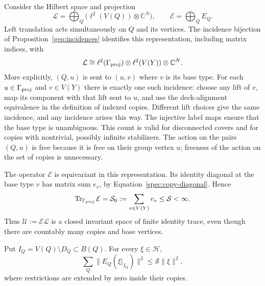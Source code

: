 Consider the Hilbert space and projection
\begin{equation}
 \mathcal L=\bigoplus_Q\big(\ell^2(V(Q))\otimes\mathbb C^N\big),
       \qquad\mathcal E=\bigoplus_Q E_Q.
 \label{spec:all-copies}
\end{equation}
Left translation acts simultaneously on $Q$ and its vertices. The
incidence bijection of Proposition~\ref{geo:incidences} identifies this
representation, including matrix indices, with
\begin{equation}
 \mathcal L\cong\ell^2(\Gamma_{\mathrm{proj}})\otimes\ell^2(V(Y))\otimes\mathbb C^N.
 \label{spec:incidence-identification}
\end{equation}
More explicitly, $(Q,u)$ is sent to $(u,v)$ where $v$ is its base type.
For each $u\in\Gamma_{\mathrm{proj}}$ and $v\in V(Y)$ there is exactly one such incidence:
choose any lift of $v$, map its component with that lift sent to $u$,
and use the deck-alignment equivalence in the definition of indexed
copies. Different lift choices give the same incidence, and any
incidence arises this way. The injective label maps ensure that the
base type is unambiguous. This count is valid for disconnected covers
and for copies with nontrivial, possibly infinite stabilizers. The
action on the pairs $(Q,u)$ is free because it is free on their group
vertex $u$; freeness of the action on the set of copies is unnecessary.

The operator $\mathcal E$ is equivariant in this representation. Its
identity diagonal at the base type $v$ has matrix sum $e_v$, by
Equation~\eqref{spec:copy-diagonal}. Hence
\begin{equation}
 \operatorname{Tr}_{\Gamma_{\mathrm{proj}}}\mathcal E
     =\mathcal S_0:=\sum_{v\in V(Y)}e_v
     \leq\mathcal S<\infty.
 \label{spec:all-copies-size}
\end{equation}
Thus $\mathcal U:=\mathcal E\mathcal L$ is a closed invariant space of
finite identity trace, even though there are countably many copies and
base vertices.

\begin{lemma}
\label{spec:lost-restrictions}
Put $I_Q=V(Q)\setminus D_Q\subset B(Q)$. For every $\xi\in\mathcal H$,
\begin{equation}
 \sum_Q\|E_Q(\xi|_{I_Q})\|^2\leq\mathcal S\|\xi\|^2,
 \label{spec:all-copy-cut-loss}
\end{equation}
where restrictions are extended by zero inside their copies.
\end{lemma}

